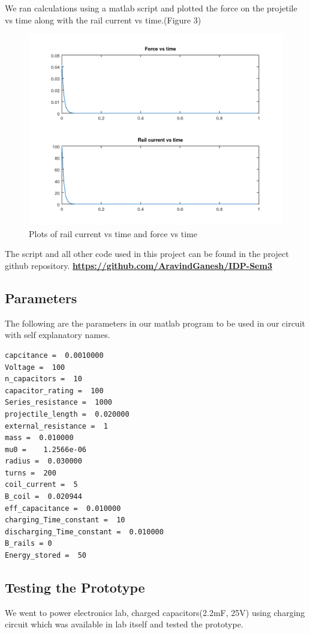 \documentclass[twoside,twocolumn]{article}
\begin{document}
	
We ran calculations using a matlab script and plotted the force on the projetile vs time along with the rail current vs time.(Figure 3)

\begin{figure}[h]
	\caption{Plots of rail current vs time and force vs time}
	\includegraphics[width=\linewidth]{plots.png}
\end{figure}
		The script and all other code used in this project can be found in the project github repository.
\href{https://github.com/AravindGanesh/IDP-Sem3}{\textbf{https://github.com/AravindGanesh/IDP-Sem3}}
\subsection*{\textbf{Parameters}}

The following are the parameters in our matlab program  to be used in our circuit with self explanatory names. 

\begin{lstlisting}[frame=single]
capcitance =  0.0010000
Voltage =  100
n_capacitors =  10
capacitor_rating =  100
Series_resistance =  1000
projectile_length =  0.020000
external_resistance =  1
mass =  0.010000
mu0 =    1.2566e-06
radius =  0.030000
turns =  200
coil_current =  5
B_coil =  0.020944
eff_capacitance =  0.010000
charging_Time_constant =  10
discharging_Time_constant =  0.010000
B_rails = 0
Energy_stored =  50
\end{lstlisting}




\subsection*{Testing the Prototype}
We went to power electronics lab,
charged capacitors(2.2mF, 25V) using charging circuit which was available in lab itself and tested the prototype.
\end{document}
